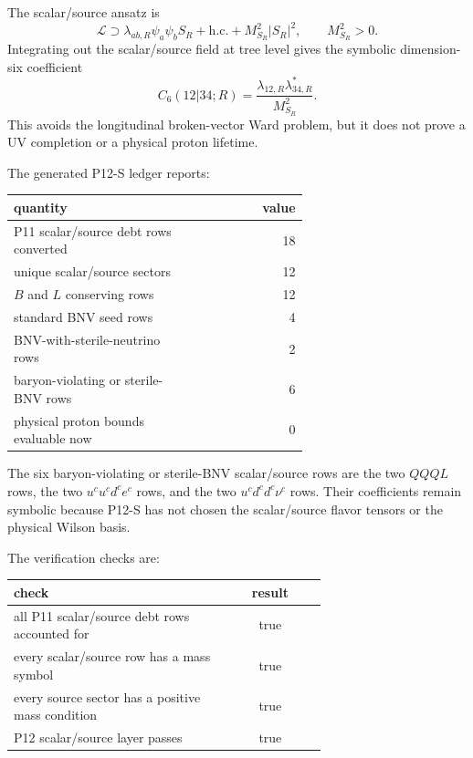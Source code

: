\documentclass[11pt]{article}
\newcommand{\uc}{u^c}
\newcommand{\dc}{d^c}
\newcommand{\nuc}{\nu^c}
\newcommand{\ec}{e^c}
\begin{document}
The scalar/source ansatz is
\begin{equation}
  \mathcal L
  \supset
  \lambda_{ab,R}\psi_a\psi_b S_R
  +\mathrm{h.c.}
  +M_{S_R}^2 |S_R|^2,
  \qquad M_{S_R}^2>0 .
\end{equation}
Integrating out the scalar/source field at tree level gives the symbolic
dimension-six coefficient
\begin{equation}
  C_6(12|34;R)
  =
  \frac{\lambda_{12,R}\lambda_{34,R}^{\ast}}{M_{S_R}^2}.
\end{equation}
This avoids the longitudinal broken-vector Ward problem, but it does not
prove a UV completion or a physical proton lifetime.

The generated P12-S ledger reports:
\begin{center}
\small
\begin{tabular}{p{0.64\linewidth}r}
\toprule
quantity & value\\
\midrule
P11 scalar/source debt rows converted & 18\\
unique scalar/source sectors & 12\\
$B$ and $L$ conserving rows & 12\\
standard BNV seed rows & 4\\
BNV-with-sterile-neutrino rows & 2\\
baryon-violating or sterile-BNV rows & 6\\
physical proton bounds evaluable now & 0\\
\bottomrule
\end{tabular}
\end{center}
The six baryon-violating or sterile-BNV scalar/source rows are the two
$QQQL$ rows, the two $\uc\uc\dc\ec$ rows, and the two
$\uc\dc\dc\nuc$ rows.  Their coefficients remain symbolic because P12-S has
not chosen the scalar/source flavor tensors or the physical Wilson basis.

The verification checks are:
\begin{center}
\small
\begin{tabular}{p{0.68\linewidth}c}
\toprule
check & result\\
\midrule
all P11 scalar/source debt rows accounted for & true\\
every scalar/source row has a mass symbol & true\\
every source sector has a positive mass condition & true\\
P12 scalar/source layer passes & true\\
\bottomrule
\end{tabular}
\end{center}
\end{document}
